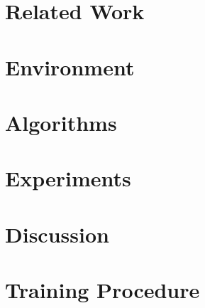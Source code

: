 \documentclass{article}
\theoremstyle{plain}
\theoremstyle{definition}
\theoremstyle{remark}
\begin{document}
\section{Related Work}\label{sec:related_work}


\section{Environment}\label{sec:environment}


\section{Algorithms}\label{sec:algorithms}


\section{Experiments}\label{sec:limitations}


\section{Discussion}\label{sec:discussion}






\newpage
\appendix
\onecolumn
\section{Training Procedure} \label{sec:training_procedure}
\end{document}
